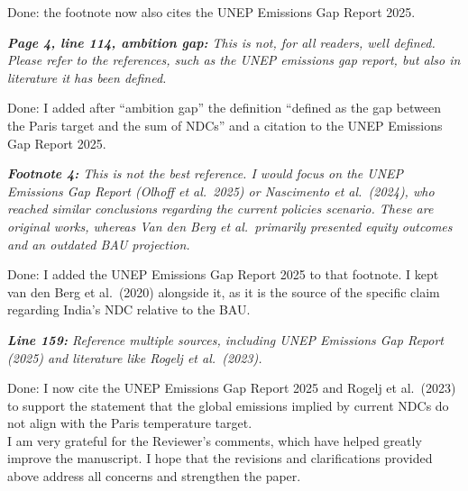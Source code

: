 \documentclass[11pt]{article}
\newenvironment{italic}{\itshape}{\par}
\begin{document}
Done: the footnote now also cites the UNEP Emissions Gap Report 2025.



\begin{italic}
\textbf{Page 4, line 114, ambition gap:} This is not, for all readers, well defined. Please refer to the references, such as the UNEP emissions gap report, but also in literature it has been defined.
\end{italic}

Done: I added after ``ambition gap'' the definition ``defined as the gap between the Paris target and the sum of NDCs'' and a citation to the UNEP Emissions Gap Report 2025.




\begin{italic}
\textbf{Footnote 4:} This is not the best reference. I would focus on the UNEP Emissions Gap Report (Olhoff et al.\ 2025) or Nascimento et al.\ (2024), who reached similar conclusions regarding the current policies scenario. These are original works, whereas Van den Berg et al.\ primarily presented equity outcomes and an outdated BAU projection.
\end{italic}


Done: I added the UNEP Emissions Gap Report 2025 to that footnote. I kept van den Berg et al.\ (2020) alongside it, as it is the source of the specific claim regarding India's NDC relative to the BAU.



\begin{italic}
\textbf{Line 159:} Reference multiple sources, including UNEP Emissions Gap Report (2025) and literature like Rogelj et al.\ (2023).
\end{italic}

Done: I now cite the UNEP Emissions Gap Report 2025 and Rogelj et al.\ (2023) to support the statement that the global emissions implied by current NDCs do not align with the Paris temperature target.
\\

I am very grateful for the Reviewer's comments, which have helped greatly improve the manuscript. I hope that the revisions and clarifications provided above address all concerns and strengthen the paper.
\end{document}
